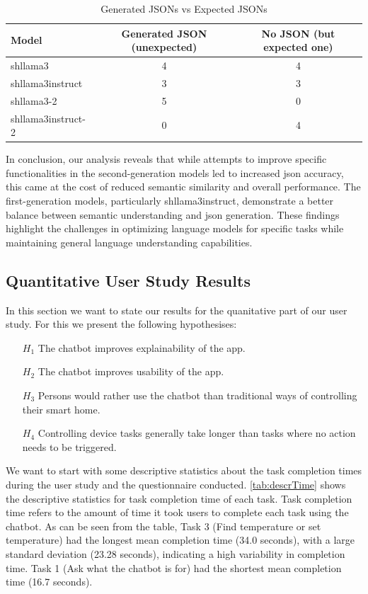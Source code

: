 \begin{table}[h!]
    \centering
    \begin{tabular}{lcc}
        \toprule
        Model & Generated JSON (unexpected) & No JSON (but expected one) \\
        \midrule
        shllama3       & 4 & 4 \\
        shllama3instruct  & 3 & 3 \\
        shllama3-2     & 5 & 0 \\
        shllama3instruct-2& 0 & 4 \\
        \bottomrule
    \end{tabular}
    \caption{Generated JSONs vs Expected JSONs}
    \label{tab:json_summary}
\end{table}

In conclusion, our analysis reveals that while attempts to improve specific functionalities in the second-generation models led to increased \gls{json} accuracy, this came at the cost of reduced semantic similarity and overall performance. The first-generation models, particularly shllama3instruct, demonstrate a better balance between semantic understanding and \gls{json} generation. These findings highlight the challenges in optimizing language models for specific tasks while maintaining general language understanding capabilities.


\subsection{Quantitative User Study Results}
In this section we want to state our results for the quanitative part of our user study. For this we present the following hypothesises:
\begin{itemize}
    \item[\(H_1\)] The chatbot improves explainability of the app.
    \item[\(H_2\)] The chatbot improves usability of the app.
    \item[\(H_3\)] Persons would rather use the chatbot than traditional ways of controlling their smart home.
    \item[\(H_4\)] Controlling device tasks generally take longer than tasks where no action needs to be triggered.
\end{itemize}

We want to start with some descriptive statistics about the task completion times during the user study and the questionnaire conducted.
\cref{tab:descrTime} shows the descriptive statistics for task completion time of each task. Task completion time refers to the amount of time it took users to complete each task using the chatbot. As can be seen from the table, Task 3 (Find temperature or set temperature) had the longest mean completion time (34.0 seconds), with a large standard deviation (23.28 seconds),  indicating a high variability in completion time. Task 1 (Ask what the chatbot is for) had the shortest mean completion time (16.7 seconds).


